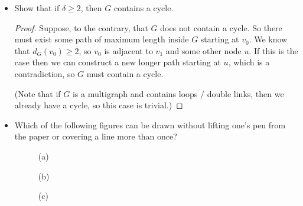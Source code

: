\documentclass[11pt]{article}
\newcommand\itm[1]{\item[\textbf{#1}]}
\begin{document}
\begin{itemize}
  \itm{1.7.2} Show that if \(\delta \geq 2\), then \(G\) contains a cycle.
  \begin{proof}
    Suppose, to the contrary, that \(G\) does not contain a cycle.  So there must exist some path of maximum length inside \(G\) starting at \(v_0\).  We know that \(d_G(v_0) \geq 2\), so \(v_0\) is adjacent to \(v_1\) and some other node \(u\).  If this is the case then we can construct a new longer path starting at \(u\), which is a contradiction, so \(G\) must contain a cycle.

    (Note that if \(G\) is a multigraph and contains loops / double links, then we already have a cycle, so this case is trivial.)
  \end{proof}



  \itm{4.1.1} Which of the following figures can be drawn without lifting one's pen from the paper or covering a line more than once?
    \begin{figure}[!ht]
      \begin{minipage}{0.3\textwidth}
        \centering
        \captionsetup{labelformat=empty}
        \caption{(a)}
      \end{minipage}
      \begin{minipage}{0.3\textwidth}
        \centering
        \captionsetup{labelformat=empty}
        \caption{(b)}
      \end{minipage}
      \begin{minipage}{0.3\textwidth}
        \centering
        \captionsetup{labelformat=empty}
        \caption{(c)}
      \end{minipage}
    \end{figure}


\end{itemize}
\end{document}
